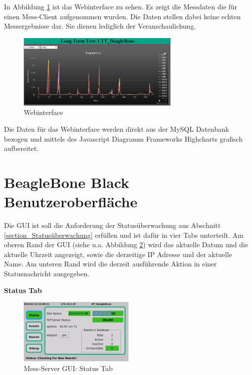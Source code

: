 In Abbildung \ref{figure_Webinterface} ist das Webinterface zu sehen. Es zeigt die Messdaten die für einen Mess-Client aufgenommen wurden. Die Daten stellen dabei keine echten Messergebnisse dar. Sie dienen lediglich der Veranschaulichung.

\begin{figure}[H]
\begin{center}
\includegraphics[width=0.7\textwidth ]{img/general/Webinterface.png}
\caption{Webinterface}
\label{figure_Webinterface}
\end{center}
\end{figure}

Die Daten für das Webinterface werden direkt aus der MySQL Datenbank bezogen und mittels des Javascript Diagramm Frameworks Highcharts \cite{highcharts} grafisch aufbereitet.

\newpage
\section{BeagleBone Black Benutzeroberfläche }
Die \ac{GUI} ist soll die Anforderung der Statusüberwachung aus Abschnitt \ref{section_Statusüberwachung} erfüllen und ist dafür in vier Tabs unterteilt. Am oberen Rand der \ac{GUI} (siehe u.a. Abbildung \ref{figure_MessServerGUIStatus}) wird das aktuelle Datum und die aktuelle Uhrzeit angezeigt, sowie die derzeitige IP Adresse und der aktuelle Name. Am unteren Rand wird die derzeit ausführende Aktion in einer Statusnachricht ausgegeben.

\textbf{Status Tab}

\begin{figure}[H]
\begin{center}
\includegraphics[width=0.5\textwidth ]{img/GUI/Server_GUI_Status1.png}
\caption{Mess-Server GUI: Status Tab}
\label{figure_MessServerGUIStatus}
\end{center}
\end{figure}

